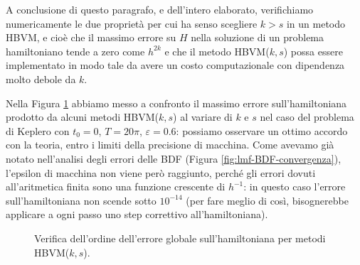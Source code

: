 A conclusione di questo paragrafo, e dell'intero elaborato, verifichiamo
numericamente le due proprietà per cui ha senso scegliere $k > s$ in un metodo
HBVM, e cioè che il massimo errore su $H$ nella soluzione di un problema
hamiltoniano tende a zero come $h^{2k}$ e che il metodo HBVM($k,s$)
possa essere implementato in modo tale da avere un costo computazionale
con dipendenza molto debole da $k$.

Nella Figura \ref{fig:errore-hamiltoniana-HBVM} abbiamo messo a confronto
il massimo errore sull'hamiltoniana prodotto da alcuni metodi HBVM($k,s$)
al variare di $k$ e $s$ nel caso del problema di Keplero con $t_0 = 0$,
$T = 20\pi$, $\varepsilon = 0.6$: possiamo osservare un ottimo accordo
con la teoria, entro i limiti della precisione di macchina.
Come avevamo già notato nell'analisi degli errori delle BDF
(Figura \ref{fig:lmf-BDF-convergenza}), l'epsilon di macchina non viene però raggiunto,
perché gli errori dovuti all'aritmetica finita sono una funzione crescente di $h^{-1}$:
in questo caso l'errore sull'hamiltoniana non scende sotto $10^{-14}$
(per fare meglio di così, bisognerebbe applicare a ogni passo uno
step correttivo all'hamiltoniana).

\begin{figure}[p]
\centering
{}
\caption{Verifica dell'ordine dell'errore globale sull'hamiltoniana per metodi HBVM($k,s$).}
\label{fig:errore-hamiltoniana-HBVM}
\end{figure}

